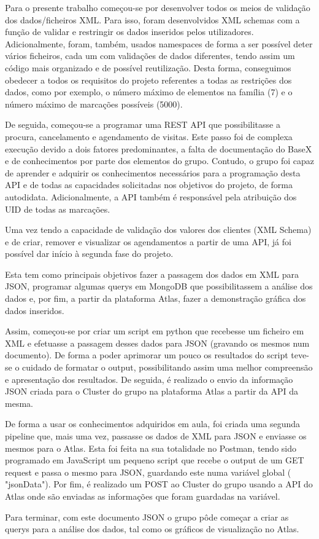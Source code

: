 \documentclass{article}
\begin{document}
\hspace{0.5cm} Para o presente trabalho começou-se por desenvolver todos os meios de validação dos dados/ficheiros XML. Para isso, foram desenvolvidos XML schemas com a função de validar e restringir os dados inseridos pelos utilizadores. Adicionalmente, foram, também, usados namespaces de forma a ser possível deter vários ficheiros, cada um com validações de dados diferentes, tendo assim um código mais organizado e de possível reutilização. Desta forma, conseguimos obedecer a todos os requisitos do projeto referentes a todas as restrições dos dados, como por exemplo, o número máximo de elementos na família (7) e o número máximo de marcações possíveis (5000). \par
De seguida, começou-se a programar uma REST API que possibilitasse a procura, cancelamento e agendamento de visitas. Este passo foi de complexa execução devido a dois fatores predominantes, a falta de documentação do BaseX e de conhecimentos por parte dos elementos do grupo. Contudo, o grupo foi capaz de aprender e adquirir os conhecimentos necessários para a programação desta API e de todas as capacidades solicitadas nos objetivos do projeto, de forma autodidata. Adicionalmente, a API também é responsável pela atribuição dos UID de todas as marcações.\par
Uma vez tendo a capacidade de validação dos valores dos clientes (XML Schema) e de criar, remover e visualizar os agendamentos a partir de uma API, já foi possível dar início à segunda fase do projeto. \par
Esta tem como principais objetivos fazer a passagem dos dados em XML para JSON, programar algumas querys em MongoDB que possibilitassem a análise dos dados e, por fim, a partir da plataforma Atlas, fazer a demonstração gráfica dos dados inseridos. \par
Assim, começou-se por criar um script em python que recebesse um ficheiro em XML e efetuasse a passagem desses dados para JSON (gravando os mesmos num documento). De forma a poder aprimorar um pouco os resultados do script teve-se o cuidado de formatar o output, possibilitando assim uma melhor compreensão e apresentação dos resultados. De seguida, é realizado o envio da informação JSON criada para o Cluster do grupo na plataforma Atlas a partir da API da mesma. \par
De forma a usar os conhecimentos adquiridos em aula, foi criada uma segunda pipeline que, mais uma vez, passasse os dados de XML para JSON e enviasse os mesmos para o Atlas. Esta foi feita na sua totalidade no Postman, tendo sido programado em JavaScript um pequeno script que recebe o output de um GET request e passa o mesmo para JSON, guardando este numa variável global ( "jsonData").  Por fim, é realizado um POST ao Cluster do grupo usando a API do Atlas onde são enviadas as informações que foram guardadas na variável.\par
Para terminar, com este documento JSON o grupo pôde começar a criar as querys para a análise dos dados, tal como os gráficos de visualização no Atlas.
\end{document}
